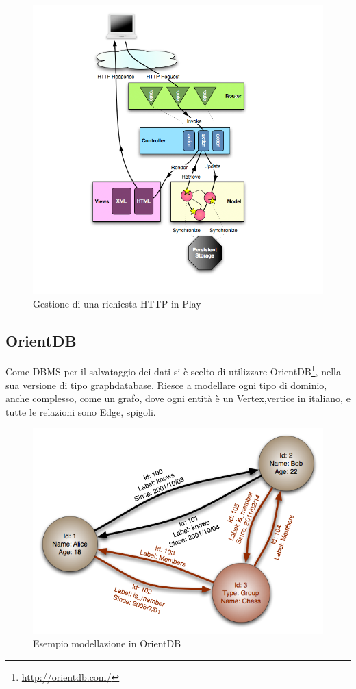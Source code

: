 \begin{figure}[h]
\centering
\includegraphics[width=0.8\linewidth]{immagini/diagrams_path}
\caption[Gestione di una richiesta HTTP in Play]{Gestione di una richiesta HTTP in Play}
\label{fig:diagrams_path}
\end{figure}

\newpage
\subsection*{OrientDB}
Come DBMS per il salvataggio dei dati si è scelto di utilizzare OrientDB\footnote{\url{http://orientdb.com/}}, nella sua versione di tipo graphdatabase. Riesce a modellare ogni tipo di dominio, anche complesso, come un grafo, dove ogni entità è un Vertex,vertice in italiano, e tutte le relazioni sono Edge, spigoli.
\begin{figure}[h]
\centering
\includegraphics[width=0.7\linewidth]{immagini/GraphDatabase_PropertyGraph}
\caption[Esempio modellazione in OrientDB]{Esempio modellazione in OrientDB}
\label{fig:GraphDatabase_PropertyGraph}
\end{figure}

